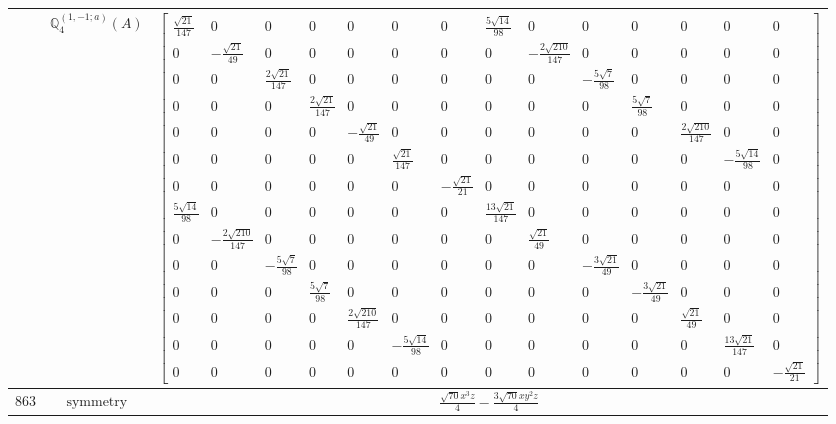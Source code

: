 \documentclass[fleqn,8pt,landscape]{jsarticle}
\begin{document}
\begin{longtable}{ccc}
$  $ & $ \mathbb{Q}_{4}^{(1,-1;a)}(A) $ & $ \begin{bmatrix} \frac{\sqrt{21}}{147} & 0 & 0 & 0 & 0 & 0 & 0 & \frac{5 \sqrt{14}}{98} & 0 & 0 & 0 & 0 & 0 & 0 \\ 0 & - \frac{\sqrt{21}}{49} & 0 & 0 & 0 & 0 & 0 & 0 & - \frac{2 \sqrt{210}}{147} & 0 & 0 & 0 & 0 & 0 \\ 0 & 0 & \frac{2 \sqrt{21}}{147} & 0 & 0 & 0 & 0 & 0 & 0 & - \frac{5 \sqrt{7}}{98} & 0 & 0 & 0 & 0 \\ 0 & 0 & 0 & \frac{2 \sqrt{21}}{147} & 0 & 0 & 0 & 0 & 0 & 0 & \frac{5 \sqrt{7}}{98} & 0 & 0 & 0 \\ 0 & 0 & 0 & 0 & - \frac{\sqrt{21}}{49} & 0 & 0 & 0 & 0 & 0 & 0 & \frac{2 \sqrt{210}}{147} & 0 & 0 \\ 0 & 0 & 0 & 0 & 0 & \frac{\sqrt{21}}{147} & 0 & 0 & 0 & 0 & 0 & 0 & - \frac{5 \sqrt{14}}{98} & 0 \\ 0 & 0 & 0 & 0 & 0 & 0 & - \frac{\sqrt{21}}{21} & 0 & 0 & 0 & 0 & 0 & 0 & 0 \\ \frac{5 \sqrt{14}}{98} & 0 & 0 & 0 & 0 & 0 & 0 & \frac{13 \sqrt{21}}{147} & 0 & 0 & 0 & 0 & 0 & 0 \\ 0 & - \frac{2 \sqrt{210}}{147} & 0 & 0 & 0 & 0 & 0 & 0 & \frac{\sqrt{21}}{49} & 0 & 0 & 0 & 0 & 0 \\ 0 & 0 & - \frac{5 \sqrt{7}}{98} & 0 & 0 & 0 & 0 & 0 & 0 & - \frac{3 \sqrt{21}}{49} & 0 & 0 & 0 & 0 \\ 0 & 0 & 0 & \frac{5 \sqrt{7}}{98} & 0 & 0 & 0 & 0 & 0 & 0 & - \frac{3 \sqrt{21}}{49} & 0 & 0 & 0 \\ 0 & 0 & 0 & 0 & \frac{2 \sqrt{210}}{147} & 0 & 0 & 0 & 0 & 0 & 0 & \frac{\sqrt{21}}{49} & 0 & 0 \\ 0 & 0 & 0 & 0 & 0 & - \frac{5 \sqrt{14}}{98} & 0 & 0 & 0 & 0 & 0 & 0 & \frac{13 \sqrt{21}}{147} & 0 \\ 0 & 0 & 0 & 0 & 0 & 0 & 0 & 0 & 0 & 0 & 0 & 0 & 0 & - \frac{\sqrt{21}}{21} \end{bmatrix} $ \\ \hline
$ 863 $ & $ \text{symmetry} $ & $ \frac{\sqrt{70} x^{3} z}{4} - \frac{3 \sqrt{70} x y^{2} z}{4} $ \\

\end{longtable}
\end{document}
